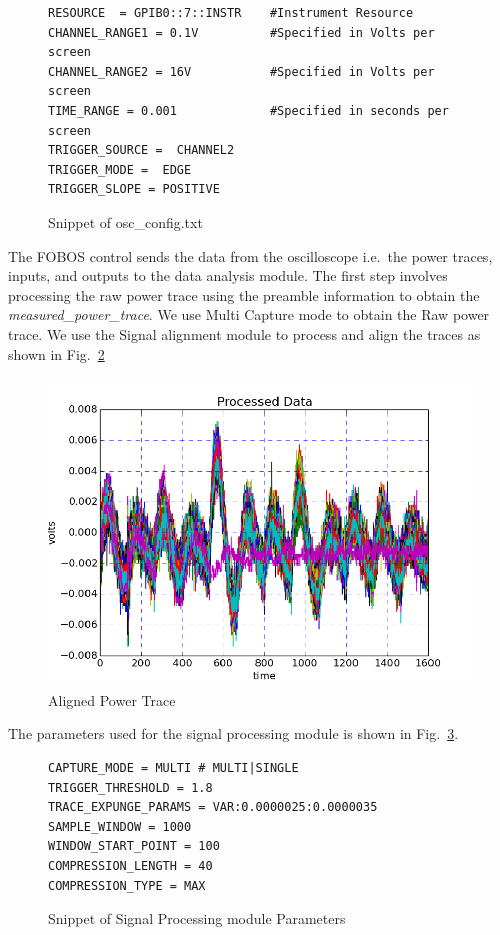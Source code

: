 \documentclass{llncs}
\numberwithin{algorithm}{chapter}
\begin{document}
\begin{figure}[h]
\begin{Verbatim}[frame=single]
RESOURCE  = GPIB0::7::INSTR    #Instrument Resource
CHANNEL_RANGE1 = 0.1V          #Specified in Volts per screen
CHANNEL_RANGE2 = 16V           #Specified in Volts per screen
TIME_RANGE = 0.001             #Specified in seconds per screen
TRIGGER_SOURCE =  CHANNEL2
TRIGGER_MODE =  EDGE  
TRIGGER_SLOPE = POSITIVE
\end{Verbatim}
\caption{\label{fig:fobos:osccon}Snippet of osc\_config.txt}
\end{figure}

The FOBOS control sends the data from the oscilloscope i.e.\ the power traces, inputs, and outputs to
the data analysis module. The first step involves processing the raw 
power trace using the preamble information to obtain the \emph{measured\_power\_trace}.
We use Multi Capture mode to obtain the Raw power trace. We use the Signal alignment 
module to process and align the traces as shown in Fig.~\ref{fig:alpt}


\begin{figure}[h]
\begin{center}
\includegraphics[scale=0.8]{figures/scaTrace1}
\caption{\label{fig:alpt}Aligned Power Trace}
\end{center} 
\vspace{-3ex}
\end{figure}

The parameters used for the signal processing module is shown in Fig.~\ref{fig:fobos:paramsa}.

\begin{figure}[h]
\begin{Verbatim}[frame=single]
CAPTURE_MODE = MULTI # MULTI|SINGLE
TRIGGER_THRESHOLD = 1.8
TRACE_EXPUNGE_PARAMS = VAR:0.0000025:0.0000035
SAMPLE_WINDOW = 1000
WINDOW_START_POINT = 100
COMPRESSION_LENGTH = 40
COMPRESSION_TYPE = MAX
\end{Verbatim}
\caption{\label{fig:fobos:paramsa}Snippet of Signal Processing module Parameters}
\end{figure}
\end{document}
